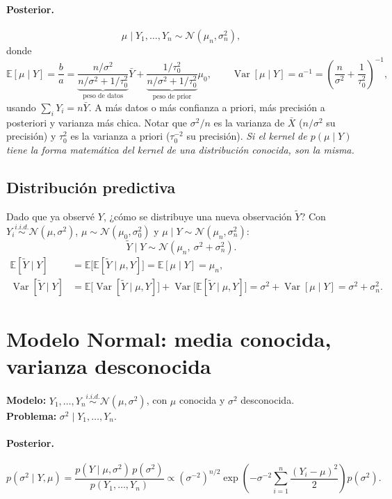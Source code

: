 \documentclass[11pt]{article}
\newcommand{\N}{\mathcal{N}}
\newcommand{\E}{\mathbb{E}}
\newcommand{\Var}{\operatorname{Var}}
\theoremstyle{definition}
\begin{document}
\paragraph{Posterior.}
\[
\mu\mid Y_1,\dots,Y_n\sim\N(\mu_n,\sigma_n^2),
\]
donde
\[
\E[\mu\mid Y]=\frac{b}{a}
=\underbrace{\frac{n/\sigma^2}{n/\sigma^2+1/\tau_0^2}}_{\text{peso de datos}}\bar Y+\underbrace{\frac{1/\tau_0^2}{n/\sigma^2+1/\tau_0^2}}_{\text{peso de prior}}\mu_0,
\qquad
\Var[\mu\mid Y]=a^{-1}=\left(\frac{n}{\sigma^2}+\frac{1}{\tau_0^2}\right)^{-1},
\]
usando $\sum_i Y_i=n\bar Y$. A más datos o más confianza a priori, más precisión a posteriori y varianza más chica. Notar que $\sigma^2/n$ es la varianza de $\bar X$ ($n/\sigma^2$ su precisión) y $\tau_0^2$ es la varianza a priori ($\tau_0^{-2}$ su precisión). \emph{Si el kernel de $p(\mu\mid Y)$ tiene la forma matemática del kernel de una distribución conocida, son la misma.}

\subsection{Distribución predictiva}
Dado que ya observé $Y$, ¿cómo se distribuye una nueva observación $\tilde Y$? Con $Y_i\overset{i.i.d.}{\sim}\N(\mu,\sigma^2)$, $\mu\sim\N(\mu_0,\sigma_0^2)$ y $\mu\mid Y\sim\N(\mu_n,\sigma_n^2)$:
\[
\tilde Y\mid Y\sim\N(\mu_n,\ \sigma^2+\sigma_n^2).
\]
\begin{align*}
\E[\tilde Y\mid Y]&=\E\big[\E[\tilde Y\mid\mu,Y]\big]=\E[\mu\mid Y]=\mu_n,\\
\Var[\tilde Y\mid Y]&=\E\big[\Var[\tilde Y\mid\mu,Y]\big]+\Var\big[\E[\tilde Y\mid\mu,Y]\big]=\sigma^2+\Var[\mu\mid Y]=\sigma^2+\sigma_n^2.
\end{align*}

\section{Modelo Normal: media conocida, varianza desconocida}
\textbf{Modelo:} $Y_1,\dots,Y_n\overset{i.i.d.}{\sim}\N(\mu,\sigma^2)$, con $\mu$ conocida y $\sigma^2$ desconocida.\\
\textbf{Problema:} $\sigma^2\mid Y_1,\dots,Y_n$.

\paragraph{Posterior.}
\[
p(\sigma^2\mid Y,\mu)=\frac{p(Y\mid\mu,\sigma^2)\,p(\sigma^2)}{p(Y_1,\dots,Y_n)}
\propto(\sigma^{-2})^{n/2}\exp\!\left(-\sigma^{-2}\sum_{i=1}^n\frac{(Y_i-\mu)^2}{2}\right)p(\sigma^2).
\]
\end{document}
